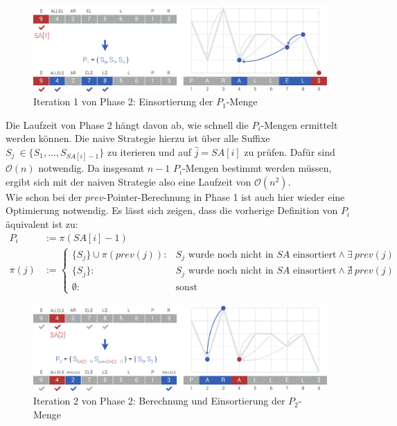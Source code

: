 \documentclass[twoside,11pt]{article}
\theoremstyle{break}
\begin{document}
\begin{figure}[h]
	\centering
	\includegraphics[width=\linewidth,bb=0 0 1310 386]{./assets/phase2-1.pdf}
	\caption{Iteration 1 von Phase 2: Einsortierung der $P_1$-Menge}
\label{fig:phase2-1}
\end{figure}

Die Laufzeit von Phase 2 hängt davon ab, wie schnell die $P_i$-Mengen ermittelt werden können. Die naive Strategie hierzu ist über alle Suffixe $S_j \ \in \{ S_1, \dots, S_{SA[i] - 1} \}$ zu iterieren und auf $\widehat{j} = SA[i]$ zu prüfen. Dafür sind $\mathcal{O}(n)$ notwendig. Da insgesamt $n - 1$ $P_i$-Mengen bestimmt werden müssen, ergibt sich mit der naiven Strategie also eine Laufzeit von $\mathcal{O}(n^2)$. \\
Wie schon bei der $prev$-Pointer-Berechnung in Phase 1 ist auch hier wieder eine Optimierung notwendig. Es lässt sich zeigen, dass die vorherige Definition von $P_i$ äquivalent ist zu:
\begin{align*}
	P_i &:= \pi(SA[i] - 1) \\
	\pi(j) &:= \begin{cases}
		\{ S_j \} \cup \pi(prev(j)): & S_j \text{ wurde noch nicht in $SA$ einsortiert} \land \exists\ prev(j) \\
		\{ S_j \}: & S_j \text{ wurde noch nicht in $SA$ einsortiert} \land \nexists\ prev(j) \\
		\emptyset: & \text{sonst}
	\end{cases}
\end{align*}
\begin{figure}[h]
	\centering
	\includegraphics[width=\linewidth,bb=0 0 1310 386]{./assets/phase2-2.pdf}
	\caption{Iteration 2 von Phase 2: Berechnung und Einsortierung der $P_2$-Menge}
\label{fig:phase2-2}
\end{figure}
\end{document}
